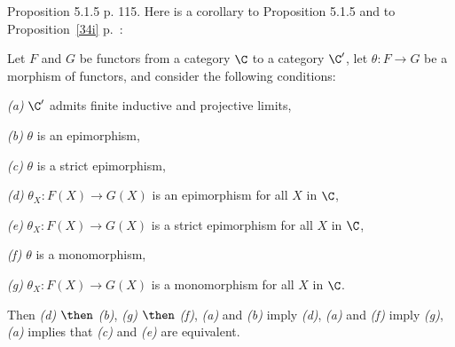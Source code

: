 \documentclass[12pt]{article}
\theoremstyle{remark}
\theoremstyle{definition}
\begin{document}
%

\begin{s}
Proposition 5.1.5 p. 115. Here is a corollary to Proposition 5.1.5 and to Proposition~\ref{34i} p.~:

\begin{cor}
Let $F$ and $G$ be functors from a category $\C$ to a category $\C'$, let $\theta:F\to G$ be a morphism of functors, and consider the following conditions: 

\nn\emph{(a)} $\C'$ admits finite inductive and projective limits,

\nn\emph{(b)} $\theta$ is an epimorphism,

\nn\emph{(c)} $\theta$ is a strict epimorphism,

\nn\emph{(d)} $\theta_X:F(X)\to G(X)$ is an epimorphism for all $X$ in $\C$,

\nn\emph{(e)} $\theta_X:F(X)\to G(X)$ is a strict epimorphism for all $X$ in $\C$,

\nn\emph{(f)} $\theta$ is a monomorphism,

\nn\emph{(g)} $\theta_X:F(X)\to G(X)$ is a monomorphism for all $X$ in $\C$.

\nn Then \emph{(d)} $\then$ \emph{(b)}, \emph{(g)} $\then$ \emph{(f)}, \emph{(a)} and \emph{(b)} imply \emph{(d)}, \emph{(a)} and \emph{(f)} imply \emph{(g)}, \emph{(a)} implies that \emph{(c)} and \emph{(e)} are equivalent. 
\end{cor}
\end{s}

%
\end{document}
